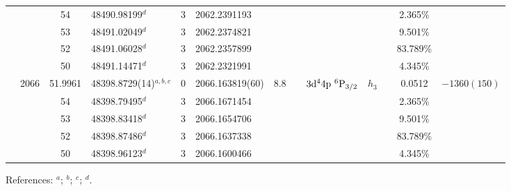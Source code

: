 \begin{table*}
\begin{center}
{\begin{tabular}{:l;l;c;l;c;l;c;l;l;c;c;c;c}
\rowstyle{\itshape}               &        & 54        & 48490.98199$^{d}$                & 3 &  2062.2391193      &      & $                                        $ & $                                        $ & $      $ &              & 2.365\%   & $          $\\
\rowstyle{\itshape}               &        & 53        & 48491.02049$^{d}$                & 3 &  2062.2374821      &      & $                                        $ & $                                        $ & $      $ &              & 9.501\%   & $          $\\
\rowstyle{\itshape}               &        & 52        & 48491.06028$^{d}$                & 3 &  2062.2357899      &      & $                                        $ & $                                        $ & $      $ &              & 83.789\%  & $          $\\
\rowstyle{\itshape}               &        & 50        & 48491.14471$^{d}$                & 3 &  2062.2321991      &      & $                                        $ & $                                        $ & $      $ &              & 4.345\%   & $          $\\
                                  & 2066   & 51.9961   & 48398.8729(14)$^{a,b,c}$         & 0 &   2066.163819(60)  &  8.8 & $                                        $ & $3\rm{d}^44\rm{p}~^6\rm{P}_{3/2}         $ & $h_{3} $ &              & 0.0512    & $-1360(150)$\\
\rowstyle{\itshape}               &        & 54        & 48398.79495$^{d}$                & 3 &  2066.1671454      &      & $                                        $ & $                                        $ & $      $ &              & 2.365\%   & $          $\\
\rowstyle{\itshape}               &        & 53        & 48398.83418$^{d}$                & 3 &  2066.1654706      &      & $                                        $ & $                                        $ & $      $ &              & 9.501\%   & $          $\\
\rowstyle{\itshape}               &        & 52        & 48398.87486$^{d}$                & 3 &  2066.1637338      &      & $                                        $ & $                                        $ & $      $ &              & 83.789\%  & $          $\\
\rowstyle{\itshape}               &        & 50        & 48398.96123$^{d}$                & 3 &  2066.1600466      &      & $                                        $ & $                                        $ & $      $ &              & 4.345\%   & $          $\\
\hline
\end{tabular}
}
{\footnotesize References:
$^{a}$\citet{Aldenius:2009:014008};
$^{b}$\citet{Pickering:2000:163};
$^{c}$\citet{Nave:2012:1570};
$^{d}$\citet{Berengut:2011:052520}.}
\end{center}
\end{table*}
